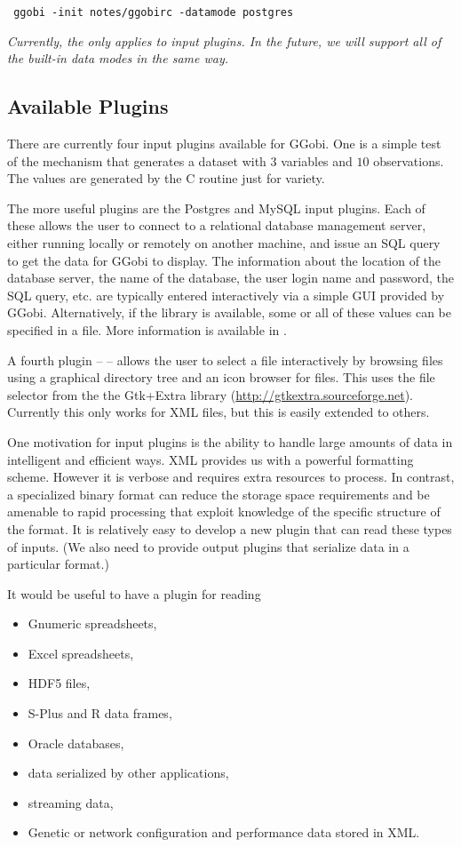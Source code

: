 \documentclass{article}
\def\file#1{\href{#1}{\Escape{#1}}}
\begin{document}
\begin{verbatim}
 ggobi -init notes/ggobirc -datamode postgres
\end{verbatim}

\textit{Currently, the  only applies to input plugins.
In the future, we will support all of the built-in data modes in the
same way.}


\subsection{Available Plugins}
There are currently four input plugins available for GGobi.  One is a
simple test of the mechanism that generates a dataset with $3$
variables and $10$ observations.  The values are generated by the C
routine  just for variety.

The more useful plugins are the Postgres and MySQL input plugins.
Each of these allows the user to connect to a relational database
management server, either running locally or remotely on another
machine, and issue an SQL query to get the data for GGobi to display.
The information about the location of the database server, the name of
the database, the user login name and password, the SQL query, etc.
are typically entered interactively via a simple GUI provided by
GGobi.  Alternatively, if the  library is
available, some or all of these values can be specified in a file.
More information is available in \file{DBMS.pdf}.

A fourth plugin --  -- allows the user to select a
file interactively by browsing files using a graphical directory tree
and an icon browser for files.  This uses the file selector from the
the Gtk+Extra library (\url{http://gtkextra.sourceforge.net}).
Currently this only works for XML files, but this is easily extended
to others.

One motivation for input plugins is the ability to handle large
amounts of data in intelligent and efficient ways.  XML provides us
with a powerful formatting scheme.  However it is verbose and requires
extra resources to process. In contrast, a specialized binary format
can reduce the storage space requirements and be amenable to rapid
processing that exploit knowledge of the specific structure of the
format. It is relatively easy to develop a new plugin that can read
these types of inputs.  (We also need to provide output plugins that
serialize data in a particular format.)


It would be useful to have a plugin for reading 
\begin{itemize}
\item Gnumeric spreadsheets,
\item Excel spreadsheets,
\item HDF5 files,
\item S-Plus and R data frames,
\item Oracle databases,
\item data serialized by other applications,
\item streaming data,
\item Genetic or network configuration and performance data stored in XML.
\end{itemize}
\end{document}
